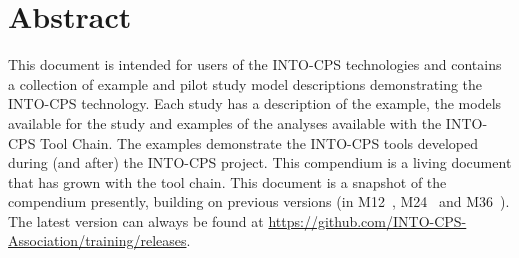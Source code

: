 \documentclass[narrowmargin,12pt,a4paper,final]{include/intocpsassociation}   %
\begin{document}
\maketitle

\section*{Abstract}
\label{sec:abstract}

This document is intended for users of the INTO-CPS technologies and contains a collection of example and pilot study model descriptions demonstrating the INTO-CPS technology. Each study has a description of the example, the models available for the study and examples of the analyses available with the INTO-CPS Tool Chain. The examples demonstrate the INTO-CPS tools developed during (and after) the INTO-CPS project. This compendium is a living document that has grown with the tool chain. This document is a snapshot of the compendium presently, building on previous versions (in M12~\cite{INTOCPSD3.4}, M24~\cite{INTOCPSD3.5} and M36~\cite{INTOCPSD3.6}). The latest version can always be found at \url{https://github.com/INTO-CPS-Association/training/releases}.

\newpage

\tableofcontents
\newpage


\clearpage

\clearpage

\clearpage

\clearpage

\clearpage

\clearpage

\clearpage

\clearpage

\clearpage

\clearpage

\clearpage


\newpage

 
\label{ch:bib} %
\end{document}
